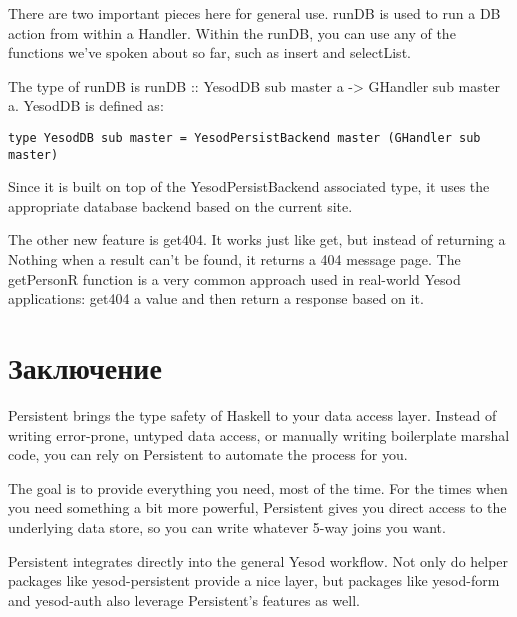 There are two important pieces here for general use. runDB is used to run a DB action from within a Handler. Within the runDB, you can use any of the functions we've spoken about so far, such as insert and selectList.

The type of runDB is runDB :: YesodDB sub master a -> GHandler sub master a. YesodDB is defined as:

\begin{lstlisting}
type YesodDB sub master = YesodPersistBackend master (GHandler sub master)
\end{lstlisting}

Since it is built on top of the YesodPersistBackend associated type, it uses the appropriate database backend based on the current site.

The other new feature is get404. It works just like get, but instead of returning a Nothing when a result can't be found, it returns a 404 message page. The getPersonR function is a very common approach used in real-world Yesod applications: get404 a value and then return a response based on it.

\section{Заключение} %

Persistent brings the type safety of Haskell to your data access layer. Instead of writing error-prone, untyped data access, or manually writing boilerplate marshal code, you can rely on Persistent to automate the process for you.

The goal is to provide everything you need, most of the time. For the times when you need something a bit more powerful, Persistent gives you direct access to the underlying data store, so you can write whatever 5-way joins you want.

Persistent integrates directly into the general Yesod workflow. Not only do helper packages like yesod-persistent provide a nice layer, but packages like yesod-form and yesod-auth also leverage Persistent's features as well.
